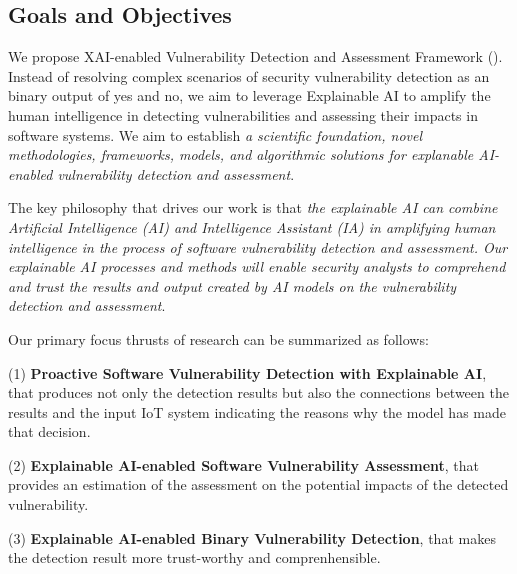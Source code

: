 \subsection{Goals and Objectives}

We propose XAI-enabled Vulnerability Detection and Assessment
Framework ({\tool}). Instead of resolving complex scenarios of
security vulnerability detection as an binary output of yes and no, we
aim to leverage Explainable AI to amplify the human intelligence in
detecting vulnerabilities and assessing their impacts in software
systems. We aim to establish {\em a scientific foundation, novel
  methodologies, frameworks, models, and algorithmic solutions for
  explanable AI-enabled vulnerability detection and assessment}.

\begin{center}
\begin{minipage}{36em}
The key philosophy that drives our work is that {\em the explainable
  AI can combine Artificial Intelligence (AI) and Intelligence Assistant (IA) in amplifying
  human intelligence in the process of software vulnerability
  detection and assessment. Our explainable AI processes and methods
  will enable security analysts to comprehend and trust the results
  and output created by AI models on the vulnerability detection and
  assessment}.
    \end{minipage}
\end{center}


Our primary focus thrusts of research can be summarized as follows:

(1) {\bf Proactive Software Vulnerability Detection with Explainable
  AI}, that produces not only the detection results but also the
connections between the results and the input IoT system indicating
the reasons why the model has made that decision.
 
(2) {\bf Explainable AI-enabled Software Vulnerability Assessment},
that provides an estimation of the assessment on the potential impacts
of the detected vulnerability.

(3) {\bf Explainable AI-enabled Binary Vulnerability Detection}, that
makes the detection result more trust-worthy and comprenhensible.


